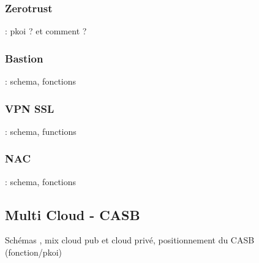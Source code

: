 \subsubsection{Zerotrust}
: pkoi ? et comment ?
\subsubsection{Bastion}
: schema, fonctions
\subsubsection{VPN SSL}
: schema, functions 
\subsubsection{NAC}
: schema, fonctions
\subsection{Multi Cloud - CASB}
Schémas , mix cloud pub et cloud privé, positionnement du CASB (fonction/pkoi)

